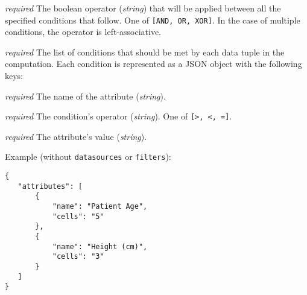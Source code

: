 \begin{description}[labelwidth=5em, leftmargin=\dimexpr\labelwidth+\labelsep\relax]
\begin{description}[labelwidth=6em, leftmargin=\dimexpr\labelwidth+\labelsep\relax]
    \begin{description}[labelwidth=5em, leftmargin=\dimexpr\labelwidth+\labelsep\relax]
        \item[\texttt{operator}:] {\color{red}\textit{required}} The boolean operator (\textit{string}) that will be applied between all the specified conditions that follow. One of \texttt{[AND, OR, XOR]}.
        In the case of multiple conditions, the operator is left\hyp associative.

        \item[\texttt{conditions}:] {\color{red}\textit{required}} The list of conditions that should be met by each data tuple in the computation.
        Each condition is represented as a JSON object with the following keys:

        \begin{description}[labelwidth=5em, leftmargin=\dimexpr\labelwidth+\labelsep\relax]
            \item[\texttt{attribute}:] {\color{red}\textit{required}} The name of the attribute (\textit{string}).

            \item[\texttt{operator}:] {\color{red}\textit{required}} The condition's operator (\textit{string}). One of \texttt{[>, <, =]}.

            \item[\texttt{value}:] {\color{red}\textit{required}}  The attribute's value (\textit{string}).
        \end{description}

    \end{description}
\end{description}

 \begin{minipage}{\linewidth}
   Example (without \texttt{datasources} or \texttt{filters}):
 {
 \begin{verbatim}
{
   "attributes": [
       {
           "name": "Patient Age",
           "cells": "5"
       },
       {
           "name": "Height (cm)",
           "cells": "3"
       }
   ]
}
 \end{verbatim}
 \label{sc:histogram-numerical-post-1}
 }
\end{minipage}


\end{description}
